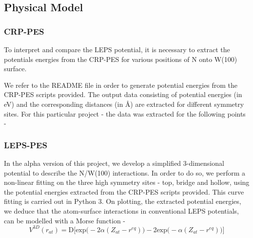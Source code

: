 \documentclass[12pt]{article}
\begin{document}
\subsection{ Physical Model}

\vspace{5mm}
\subsubsection{CRP-PES}
To interpret and compare the LEPS potential, it is necessary to extract the potentials energies from the CRP-PES for various positions of N onto W(100) surface. 

We refer to the README file in order to generate potential energies from the CRP-PES scripts provided. The output data consisting of potential energies (in eV) and the corresponding distances (in \AA) are extracted for different symmetry sites. For this particular project - the data was extracted for the following points -
\begin{table}[h!]\centering
{}
\caption{Data Extraced from CRP-PES}
\label{f1}
\end{table} 

\subsubsection{LEPS-PES}

In the alpha version of this project, we develop a simplified 3-dimensional potential to describe the N/W(100) interactions. In order to do so, we perform a non-linear fitting on the three high symmetry sites - top, bridge and hollow, using the potential energies extracted from the CRP-PES scripts provided. This curve fitting is carried out in Python 3. On plotting, the extracted potential energies, we deduce that the atom-surface interactions in conventional LEPS potentials, can be modelled with a Morse function -
\[V^{3D}(r_{at}) = \text{D}\Big[ \text{exp}\big( -2\alpha(Z_{at} - r^{eq}) \big) - 2\text{exp} \big( -\alpha(Z_{at} - r^{eq}) \big) \Big]\]
\end{document}
